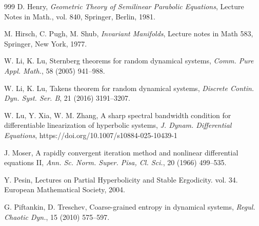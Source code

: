 \documentclass[reqno]{amsart}
\numberwithin{equation}{section}
\begin{document}
\begin{thebibliography}{999}
 D. Henry, {\it Geometric Theory of Semilinear Parabolic Equations}, Lecture Notes in Math., vol. 840, Springer, Berlin, 1981.

M. Hirsch, C. Pugh, M. Shub, {\it Invariant Manifolds}, Lecture notes in Math 583, Springer, New York, 1977.



W. Li,  K. Lu, Sternberg theorems for random dynamical systems,  {\em Comm. Pure Appl. Math.}, 58 (2005) 941--988.

W. Li,  K. Lu, Takens theorem for random dynamical systems, {\em  Discrete Contin. Dyn. Syst. Ser. B}, 21 (2016)  3191--3207.



W. Lu, Y. Xia, W. M. Zhang, A sharp spectral bandwidth condition for differentiable linearization of
hyperbolic systems,   {\em J. Dynam. Differential Equations},
https://doi.org/10.1007/s10884-025-10439-1




J.  Moser, A rapidly convergent iteration method and nonlinear differential equations II, {\em Ann. Sc.
Norm. Super. Pisa, Cl. Sci.},  20 (1966) 499--535.







Y. Pesin, Lectures on Partial Hyperbolicity and Stable Ergodicity. vol. 34. European Mathematical Society, 2004.

G. Piftankin, D. Treschev, Coarse-grained entropy in dynamical systems, {\em Regul. Chaotic Dyn.}, 15 (2010) 575--597.


\end{thebibliography}
\end{document}
